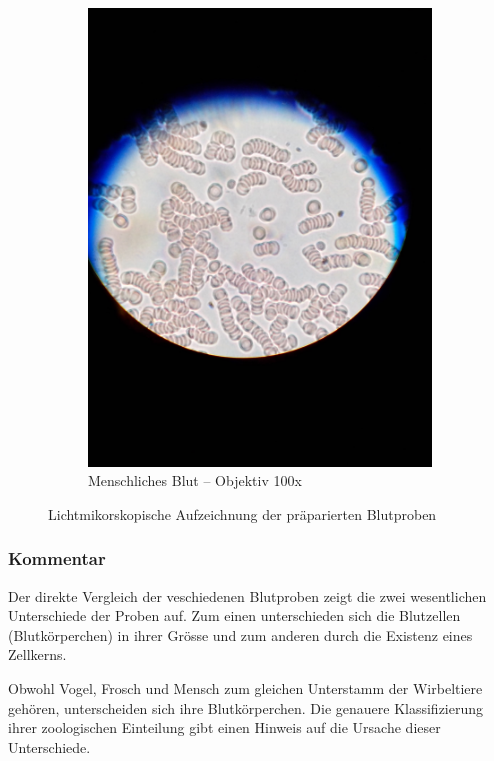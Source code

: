 \begin{figure}[h!]
\begin{subfigure}[b]{0.45\textwidth}
		\includegraphics[angle=270, width=1\textwidth]{../images/02_own_blood.jpg}
		\caption{Menschliches Blut -- Objektiv 100x}
		\label{fig:02_own_blood}
	\end{subfigure}
	\caption{Lichtmikorskopische Aufzeichnung der präparierten
		Blutproben}
\end{figure}

\subsubsection{Kommentar}
Der direkte Vergleich der veschiedenen Blutproben zeigt die zwei wesentlichen
Unterschiede der Proben auf. Zum einen unterschieden sich die Blutzellen
(Blutkörperchen) in ihrer Grösse und zum anderen durch die Existenz eines
Zellkerns.

Obwohl Vogel, Frosch und Mensch zum gleichen Unterstamm der Wirbeltiere
gehören, unterscheiden sich ihre Blutkörperchen. Die genauere Klassifizierung
ihrer zoologischen Einteilung gibt einen Hinweis auf die Ursache dieser
Unterschiede. 

